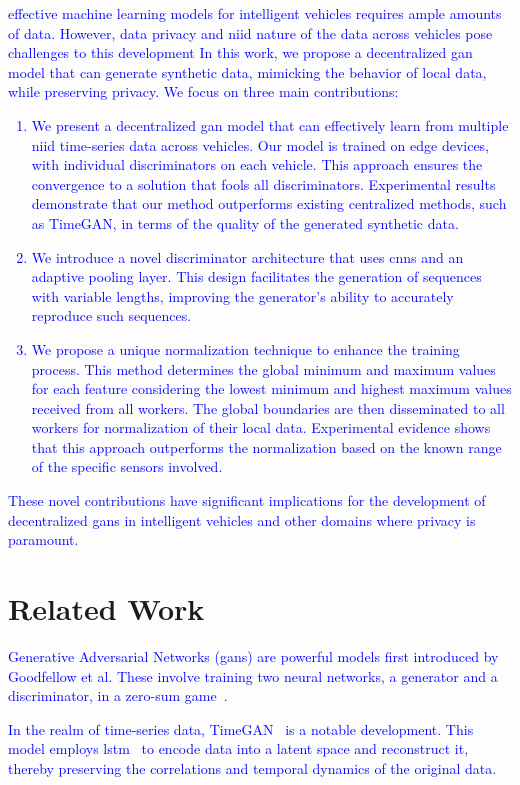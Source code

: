 \textcolor{blue}{
 effective machine learning models for intelligent vehicles requires ample amounts of data. However, data privacy and \gls*{niid} nature of the data across vehicles pose challenges to this development In this work, we propose a decentralized \gls*{gan} model that can generate synthetic data, mimicking the behavior of local data, while preserving privacy. We focus on three main contributions:
%
\begin{enumerate}
    \item We present a decentralized \gls*{gan} model that can effectively learn from multiple \gls*{niid} time-series data across vehicles. Our model is trained on edge devices, with individual discriminators on each vehicle. This approach ensures the convergence to a solution that fools all discriminators. Experimental results demonstrate that our method outperforms existing centralized methods, such as TimeGAN, in terms of the quality of the generated synthetic data.
%
    \item We introduce a novel discriminator architecture that uses \glspl*{cnn} and an adaptive pooling layer. This design facilitates the generation of sequences with variable lengths, improving the generator's ability to accurately reproduce such sequences.
%
    \item We propose a unique normalization technique to enhance the training process. This method determines the global minimum and maximum values for each feature considering the lowest minimum and highest maximum values received from all workers. The global boundaries are then disseminated to all workers for normalization of their local data. Experimental evidence shows that this approach outperforms the normalization based on the known range of the specific sensors involved.
\end{enumerate}
%
These novel contributions have significant implications for the development of decentralized \glspl*{gan} in intelligent vehicles and other domains where privacy is paramount.}
%
\section{Related Work}
\textcolor{blue}{
Generative Adversarial Networks (\glspl*{gan}) are powerful models first introduced by Goodfellow et al. These involve training two neural networks, a generator and a discriminator, in a zero-sum game~\cite{goodfellow_generative_2014}.}

\textcolor{blue}{
In the realm of time-series data, TimeGAN~\cite{yoon_time-series_2019} is a notable development. This model employs \gls*{lstm}~\cite{hochreiter_long_1997} to encode data into a latent space and reconstruct it, thereby preserving the correlations and temporal dynamics of the original data.}

